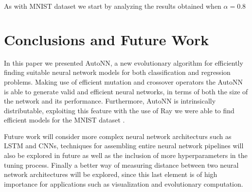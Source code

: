 \documentclass[journal]{IEEEtran}
\begin{document}
As with MNIST dataset we start by analyzing the results obtained when $\alpha=0.8$

\section{Conclusions and Future Work}
\label{sec:conclusions}

In this paper we presented AutoNN, a new evolutionary algorithm for efficiently finding suitable neural network models for both classification and regression problems. Making use of efficient mutation and crossover operators the AutoNN is able to generate valid and efficient neural networks, in terms of both the size of the network and its performance. Furthermore, AutoNN is intrinsically distributable, exploiting this feature with the use of Ray \cite{Moritz2017} we were able to find efficient models for the MNIST dataset \cite{Lecun2010}.

Future work will consider more complex neural network architecturs such as LSTM and CNNs, techniques for assembling entire neural network pipelines will also be explored in future as well as the inclusion of more hyperparameters in the tuning process. Finally a better way of measuring distance between two neural network architectures will be explored, since this last element is of high importance for applications such as visualization and evolutionary computation.

\end{document}
